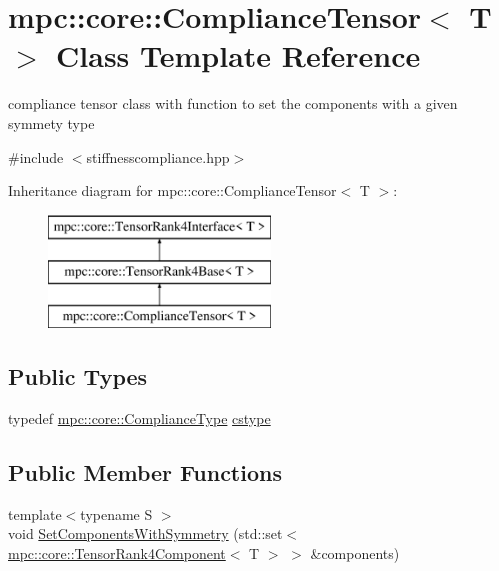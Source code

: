 \hypertarget{structmpc_1_1core_1_1_compliance_tensor}{}\section{mpc\+:\+:core\+:\+:Compliance\+Tensor$<$ T $>$ Class Template Reference}
\label{structmpc_1_1core_1_1_compliance_tensor}


compliance tensor class with function to set the components with a given symmety type  




{\ttfamily \#include $<$stiffnesscompliance.\+hpp$>$}

Inheritance diagram for mpc\+:\+:core\+:\+:Compliance\+Tensor$<$ T $>$\+:\begin{figure}[H]
\begin{center}
\leavevmode
\includegraphics[height=3.000000cm]{structmpc_1_1core_1_1_compliance_tensor}
\end{center}
\end{figure}
\subsection*{Public Types}
\begin{DoxyCompactItemize}
\item 
typedef \mbox{\hyperlink{structmpc_1_1core_1_1_compliance_type}{mpc\+::core\+::\+Compliance\+Type}} \mbox{\hyperlink{structmpc_1_1core_1_1_compliance_tensor_a354022edff660abd91a04856798d6d0e}{cstype}}
\end{DoxyCompactItemize}
\subsection*{Public Member Functions}
\begin{DoxyCompactItemize}
\item 
{\footnotesize template$<$typename S $>$ }\\void \mbox{\hyperlink{structmpc_1_1core_1_1_compliance_tensor_a47139bd25ba7fa9724b9ea87fc22ea3c}{Set\+Components\+With\+Symmetry}} (std\+::set$<$ \mbox{\hyperlink{namespacempc_1_1core_ac3a232afc7c680d580628e834030482f}{mpc\+::core\+::\+Tensor\+Rank4\+Component}}$<$ T $>$ $>$ \&components)
\end{DoxyCompactItemize}
